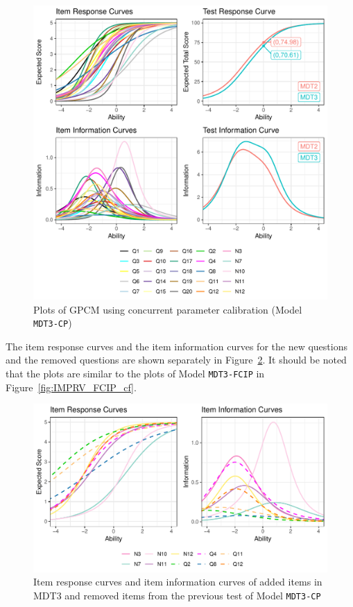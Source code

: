 \documentclass[a4paper]{report}
\begin{document}
\begin{figure}[H]
  \centering
  \includegraphics[width=\linewidth]{fig/IMPRV_17_CP.pdf}
  \caption{\label{fig:IMPRV_17_CP}Plots of GPCM using concurrent parameter calibration (Model \texttt{MDT3-CP})}
\end{figure}

The item response curves and the item information curves for the new questions and the removed questions are shown separately in Figure~\ref{fig:IMPRV_CP_cf}. It should be noted that the plots are similar to the plots of Model \texttt{MDT3-FCIP} in Figure~\ref{fig:IMPRV_FCIP_cf}. 

\begin{figure}[H]
  \centering
  \includegraphics[width=\linewidth]{fig/IMPRV_CP_cf.pdf}
  \caption{\label{fig:IMPRV_CP_cf}Item response curves and item information curves of added items in MDT3 and removed items from the previous test of Model \texttt{MDT3-CP}}
\end{figure}
\end{document}
